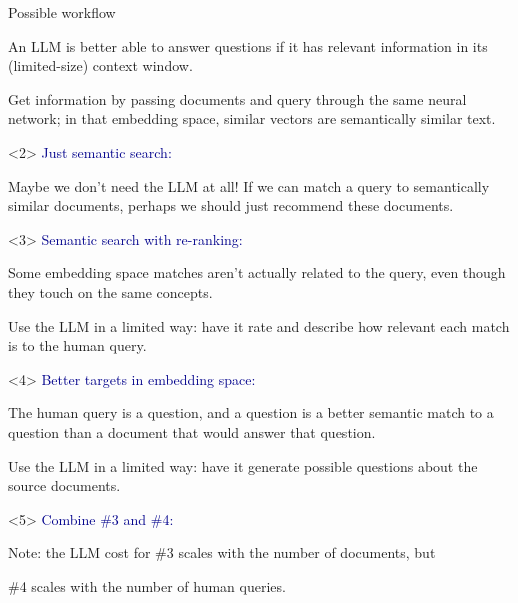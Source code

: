 \documentclass[aspectratio=169]{beamer}
\begin{document}
\begin{frame}{Possible workflow }
\begin{onlyenv}
\large
\vspace{0.25 cm}
An LLM is better able to answer questions if it has relevant information in its (limited-size) context window.

\vspace{0.25 cm}
Get information by passing documents and query through the same neural network; in that embedding space, similar vectors are semantically similar text.

\vspace{10 cm}
\end{onlyenv}\begin{onlyenv}<2>
\textcolor{darkblue}{Just semantic search:}

\large
\vspace{0.25 cm}
Maybe we don't need the LLM at all! If we can match a query to semantically similar documents, perhaps we should just recommend these documents.

\vspace{10 cm}
\end{onlyenv}\begin{onlyenv}<3>
\textcolor{darkblue}{Semantic search with re-ranking:}

\large
\vspace{0.25 cm}
Some embedding space matches aren't actually related to the query, even though they touch on the same concepts.

\vspace{0.25 cm}
Use the LLM in a limited way: have it rate and describe how relevant each match is to the human query.

\vspace{10 cm}
\end{onlyenv}\begin{onlyenv}<4>
\textcolor{darkblue}{Better targets in embedding space:}

\large
\vspace{0.25 cm}
The human query is a question, and a question is a better semantic match to a question than a document that would answer that question.

\vspace{0.25 cm}
Use the LLM in a limited way: have it generate possible questions about the source documents.

\vspace{10 cm}
\end{onlyenv}\begin{onlyenv}<5>
\textcolor{darkblue}{Combine \#3 and \#4:}

\large
\vspace{0.25 cm}
Note: the LLM cost for \#3 scales with the number of documents, but

\phantom{Note: the LLM cost for }\#4 scales with the number of human queries.
\vspace{10 cm}
\end{onlyenv}
\end{frame}
\end{document}
